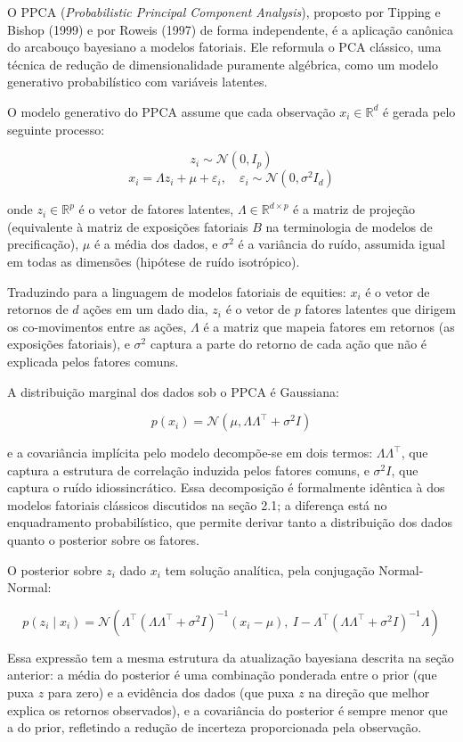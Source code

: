O PPCA (\textit{Probabilistic Principal Component Analysis}), proposto por Tipping e Bishop (1999) e por Roweis (1997) de forma independente, é a aplicação canônica do arcabouço bayesiano a modelos fatoriais. Ele reformula o PCA clássico, uma técnica de redução de dimensionalidade puramente algébrica, como um modelo generativo probabilístico com variáveis latentes.

O modelo generativo do PPCA assume que cada observação $x_i \in \mathbb{R}^d$ é gerada pelo seguinte processo:

$$z_i \sim \mathcal{N}(0, I_p)$$
$$x_i = \Lambda z_i + \mu + \varepsilon_i, \quad \varepsilon_i \sim \mathcal{N}(0, \sigma^2 I_d)$$

onde $z_i \in \mathbb{R}^p$ é o vetor de fatores latentes, $\Lambda \in \mathbb{R}^{d \times p}$ é a matriz de projeção (equivalente à matriz de exposições fatoriais $B$ na terminologia de modelos de precificação), $\mu$ é a média dos dados, e $\sigma^2$ é a variância do ruído, assumida igual em todas as dimensões (hipótese de ruído isotrópico).

Traduzindo para a linguagem de modelos fatoriais de equities: $x_i$ é o vetor de retornos de $d$ ações em um dado dia, $z_i$ é o vetor de $p$ fatores latentes que dirigem os co-movimentos entre as ações, $\Lambda$ é a matriz que mapeia fatores em retornos (as exposições fatoriais), e $\sigma^2$ captura a parte do retorno de cada ação que não é explicada pelos fatores comuns.

A distribuição marginal dos dados sob o PPCA é Gaussiana:

$$p(x_i) = \mathcal{N}(\mu, \Lambda\Lambda^\top + \sigma^2 I)$$

e a covariância implícita pelo modelo decompõe-se em dois termos: $\Lambda\Lambda^\top$, que captura a estrutura de correlação induzida pelos fatores comuns, e $\sigma^2 I$, que captura o ruído idiossincrático. Essa decomposição é formalmente idêntica à dos modelos fatoriais clássicos discutidos na seção 2.1; a diferença está no enquadramento probabilístico, que permite derivar tanto a distribuição dos dados quanto o posterior sobre os fatores.

O posterior sobre $z_i$ dado $x_i$ tem solução analítica, pela conjugação Normal-Normal:

$$p(z_i \mid x_i) = \mathcal{N}\left(\Lambda^\top(\Lambda\Lambda^\top + \sigma^2 I)^{-1}(x_i - \mu),\ I - \Lambda^\top(\Lambda\Lambda^\top + \sigma^2 I)^{-1}\Lambda\right)$$

Essa expressão tem a mesma estrutura da atualização bayesiana descrita na seção anterior: a média do posterior é uma combinação ponderada entre o prior (que puxa $z$ para zero) e a evidência dos dados (que puxa $z$ na direção que melhor explica os retornos observados), e a covariância do posterior é sempre menor que a do prior, refletindo a redução de incerteza proporcionada pela observação.

